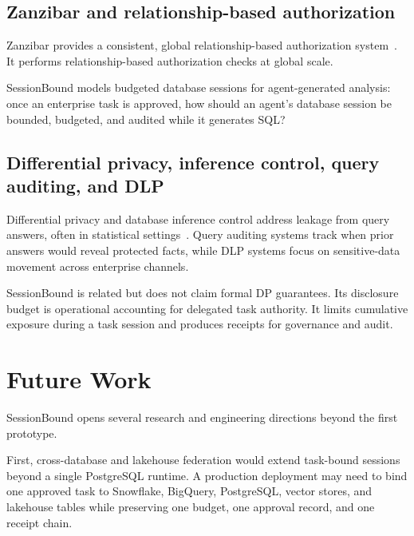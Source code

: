 \documentclass[journal]{IEEEtran}
\newcounter{algorithm}
\begin{document}
\hypertarget{zanzibar-and-relationship-based-authorization}{%
\subsection{Zanzibar and relationship-based
authorization}\label{zanzibar-and-relationship-based-authorization}}

Zanzibar provides a consistent, global relationship-based authorization
system~\cite{pang2019zanzibar}. It performs relationship-based
authorization checks at global scale.

SessionBound models budgeted database sessions for agent-generated
analysis: once an enterprise task is approved, how should an agent's
database session be bounded, budgeted, and audited while it generates
SQL?

\hypertarget{differential-privacy-inference-control-query-auditing-and-dlp}{%
\subsection{Differential privacy, inference control, query
auditing, and
DLP}\label{differential-privacy-inference-control-query-auditing-and-dlp}}

Differential privacy and database inference control address leakage from
query answers, often in statistical
settings~\cite{dwork2014algorithmic,adam1989securitycontrol}. Query
auditing systems track when prior answers would reveal protected facts,
while DLP systems focus on sensitive-data movement across enterprise
channels.

SessionBound is related but does not claim formal DP guarantees. Its
disclosure budget is operational accounting for delegated task
authority. It limits cumulative exposure during a task session and
produces receipts for governance and audit.


\hypertarget{future-work}{%
\section{Future Work}\label{future-work}}

SessionBound opens several research and engineering directions beyond
the first prototype.

First, cross-database and lakehouse federation would extend
task-bound sessions beyond a single PostgreSQL runtime. A production
deployment may need to bind one approved task to Snowflake, BigQuery,
PostgreSQL, vector stores, and lakehouse tables while preserving one
budget, one approval record, and one receipt chain.
\end{document}
